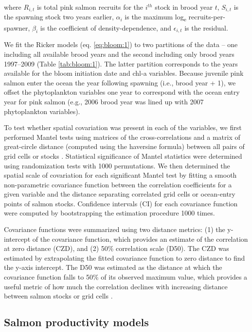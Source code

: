 \noindent where \(R_{i,t}\) is total pink salmon recruits for the \(i^{th}\)
stock in brood year \(t\), \(S_{i,t}\) is the spawning stock two years earlier,
\(\alpha_i\) is the maximum log\textsubscript{e} recruits-per-spawner,
\(\beta_i\) is the coefficient of density-dependence, and \(\epsilon_{i,t}\) is
the residual.

We fit the Ricker models (eq. \ref{eq:bloom:1}) to two partitions of the data --
one including all available brood years and the second including only brood
years 1997--2009 (Table \ref{tab:bloom:1}). The latter partition corresponds to
the years available for the bloom initiation date and chl-a variables. Because
juvenile pink salmon enter the ocean the year following spawning (i.e., brood
year + 1), we offset the phytoplankton variables one year to correspond with the
ocean entry year for pink salmon (e.g., 2006 brood year was lined up with 2007
phytoplankton variables).

To test whether spatial covariation was present in each of the variables, we
first performed Mantel tests using matrices of the cross-correlations and a
matrix of great-circle distance (computed using the haversine formula) between
all pairs of grid cells or stocks \citep{Legendre1998a, Koenig1999a}.
Statistical significance of Mantel statistics were determined using
randomization tests with 1000 permutations. We then determined the spatial
scale of covariation for each significant Mantel test by fitting a smooth
non-parametric covariance function \citep{Bjornstad2001a} between the
correlation coefficients for a given variable and the distance separating
correlated grid cells or ocean-entry points of salmon stocks. Confidence
intervals (CI) for each covariance function were computed by bootstrapping the
estimation procedure 1000 times.

Covariance functions were summarized using two distance metrics: (1) the
y-intercept of the covariance function, which provides an estimate of the
correlation at zero distance (CZD), and (2) 50\% correlation scale (D50). The
CZD was estimated by extrapolating the fitted covariance function to zero
distance to find the y-axis intercept. The D50 was estimated as the distance at
which the covariance function falls to 50\% of its observed maximum value, which
provides a useful metric of how much the correlation declines with increasing
distance between salmon stocks or grid cells \citep{Mueter2002b}.


\subsection{Salmon productivity models}

